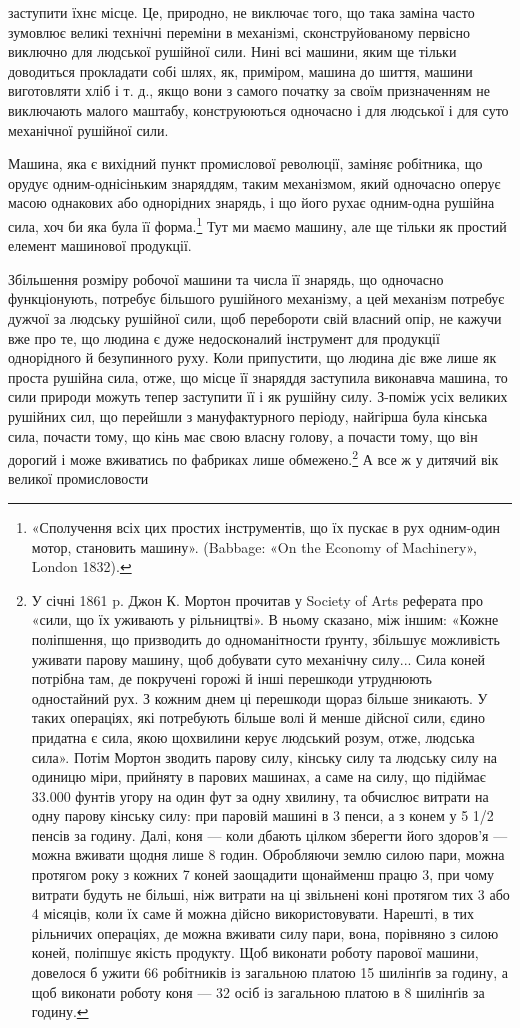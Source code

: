 заступити їхнє місце. Це, природно, не виключає того, що така
заміна часто зумовлює великі технічні переміни в механізмі,
сконструйованому первісно виключно для людської рушійної
сили. Нині всі машини, яким ще тільки доводиться прокладати
собі шлях, як, приміром, машина до шиття, машини виготовляти
хліб і т. д., якщо вони з самого початку за своїм призначенням не
виключають малого маштабу, конструюються одночасно і для людської
і для суто механічної рушійної сили.

Машина, яка є вихідний пункт промислової революції, заміняє
робітника, що орудує одним-однісіньким знаряддям, таким механізмом,
який одночасно оперує масою однакових або однорідних
знарядь, і що його рухає одним-одна рушійна сила, хоч би яка
була її форма.\footnote{
«Сполучення всіх цих простих інструментів, що їх пускає в рух
одним-один мотор, становить машину». (Babbage: «On the Economy
of Machinery», London 1832).
} Тут ми маємо машину, але ще тільки як простий
елемент машинової продукції.

Збільшення розміру робочої машини та числа її знарядь,
що одночасно функціонують, потребує більшого рушійного механізму,
а цей механізм потребує дужчої за людську рушійної сили,
щоб перебороти свій власний опір, не кажучи вже про те, що
людина є дуже недосконалий інструмент для продукції однорідного
й безупинного руху. Коли припустити, що людина діє
вже лише як проста рушійна сила, отже, що місце її знаряддя
заступила виконавча машина, то сили природи можуть тепер
заступити її і як рушійну силу. З-поміж усіх великих рушійних
сил, що перейшли з мануфактурного періоду, найгірша була
кінська сила, почасти тому, що кінь має свою власну голову,
а почасти тому, що він дорогий і може вживатись по фабриках
лише обмежено.\footnote{
У січні 1861 p. Джон К. Мортон прочитав у Society of Arts реферата
про «сили, що їх уживають у рільництві». В ньому сказано, між
іншим: «Кожне поліпшення, що призводить до одноманітности ґрунту,
збільшує можливість уживати парову машину, щоб добувати суто механічну
силу... Сила коней потрібна там, де покручені горожі й інші перешкоди
утруднюють одностайний рух. З кожним днем ці перешкоди щораз
більше зникають. У таких операціях, які потребують більше волі й менше
дійсної сили, єдино придатна є сила, якою щохвилини керує людський
розум, отже, людська сила». Потім Мортон зводить парову силу, кінську
силу та людську силу на одиницю міри, прийняту в парових машинах,
а саме на силу, що підіймає 33.000 фунтів угору на один фут за одну хвилину,
та обчислює витрати на одну парову кінську силу: при паровій
машині в 3 пенси, а з конем у 5 1/2 пенсів за годину. Далі, коня — коли
дбають цілком зберегти його здоров’я — можна вживати щодня лише
8 годин. Обробляючи землю силою пари, можна протягом року з кожних
7 коней заощадити щонайменш працю 3, при чому витрати будуть не
більші, ніж витрати на ці звільнені коні протягом тих 3 або 4 місяців,
коли їх саме й можна дійсно використовувати. Нарешті, в тих рільничих
операціях, де можна вживати силу пари, вона, порівняно з силою коней,
поліпшує якість продукту. Щоб виконати роботу парової машини, довелося
б ужити 66 робітників із загальною платою 15 шилінґів за годину,
а щоб виконати роботу коня — 32 осіб із загальною платою в 8 шилінґів
за годину.
} А все ж у дитячий вік великої промисловости
